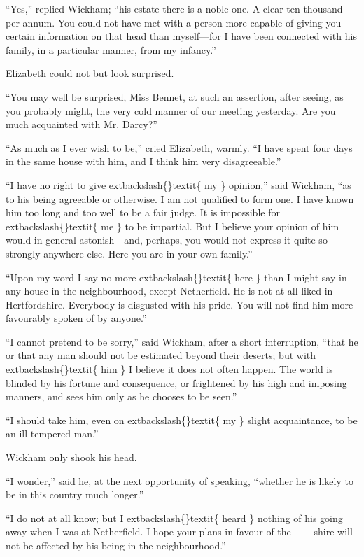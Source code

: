 \documentclass[10pt]{book}
\begin{document}
   “Yes,” replied Wickham; “his estate there is a noble one. A clear ten
thousand per annum. You could not have met with a person more capable of
giving you certain information on that head than myself—for I have been
connected with his family, in a particular manner, from my infancy.”
  

   Elizabeth could not but look surprised.
  

   “You may well be surprised, Miss Bennet, at such an assertion, after
seeing, as you probably might, the very cold manner of our meeting
yesterday. Are you much acquainted with Mr. Darcy?”
  

   “As much as I ever wish to be,” cried Elizabeth, warmly. “I have spent
four days in the same house with him, and I think him very
disagreeable.”
  

   “I have no right to give
   	extbackslash\{\}textit\{
    my
   \}
   opinion,” said Wickham, “as to his being
agreeable or otherwise. I am not qualified to form one. I have known him
too long and too well to be a fair judge. It is impossible for
   	extbackslash\{\}textit\{
    me
   \}
   to
be impartial. But I believe your opinion of him would in general
astonish—and, perhaps, you would not express it quite so strongly
anywhere else. Here you are in your own family.”
  

   “Upon my word I say no more
   	extbackslash\{\}textit\{
    here
   \}
   than I might say in any house in the
neighbourhood, except Netherfield. He is not at all liked in
Hertfordshire. Everybody is
   disgusted with his pride. You will not find
him more favourably spoken of by anyone.”
  

   “I cannot pretend to be sorry,” said Wickham, after a short
interruption, “that he or that any man should not be estimated beyond
their deserts; but with
   	extbackslash\{\}textit\{
    him
   \}
   I believe it does not often happen. The
world is blinded by his fortune and consequence, or frightened by his
high and imposing manners, and sees him only as he chooses to be seen.”
  

   “I should take him, even on
   	extbackslash\{\}textit\{
    my
   \}
   slight acquaintance, to be an
ill-tempered man.”
  

   Wickham only shook his head.
  

   “I wonder,” said he, at the next opportunity of speaking, “whether he is
likely to be in this country much longer.”
  

   “I do not at all know; but I
   	extbackslash\{\}textit\{
    heard
   \}
   nothing of his going away when I
was at Netherfield. I hope your plans in favour of the ——shire will
not be affected by his being in the neighbourhood.”
  
\end{document}
